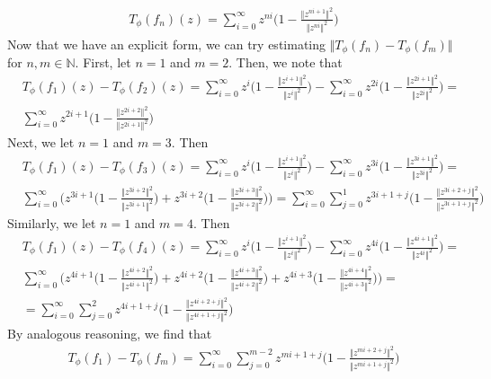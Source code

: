 \documentclass[12pt]{article}
\begin{document}
\begin{align}
T_\phi(f_n)(z) = \sum_{i=0}^\infty z^{ni} \bigg(1 - \frac{\Vert z^{ni+1}\Vert^2}{\Vert z^{ni}\Vert^2}\bigg) 
\end{align} Now that we have an explicit form, we can try estimating $\Vert T_\phi(f_n) - T_\phi(f_m)\Vert $ for $n,m \in \mathbb{N}$. First, let $n = 1$ and $m= 2$. Then, we note that
\begin{align}
&T_\phi(f_1)(z) - T_\phi(f_2)(z) = \sum_{i=0}^\infty z^i\bigg(1- \frac{\Vert z^{i+1}\Vert^2}{\Vert z^i\Vert^2}\bigg) - \sum_{i=0}^\infty z^{2i} \bigg(1 - \frac{\Vert z^{2i+1}\Vert^2}{\Vert z^{2i}\Vert^2}\bigg)=\\
& \sum_{i=0}^\infty z^{2i+1}\bigg(1-\frac{\Vert z^{2i+2}\Vert^2}{\Vert z^{2i+1}\Vert^2}\bigg)
\end{align} 
Next, we let $n = 1$ and $m=3$. Then 
\begin{align}
&T_\phi(f_1)(z) - T_\phi(f_3)(z) = \sum_{i=0}^\infty z^i \bigg(1 - \frac{\Vert z^{i+1}\Vert^2}{\Vert z^i \Vert^2} \bigg) - \sum_{i=0}^\infty z^{3i} \bigg(1 - \frac{\Vert z^{3i+1}\Vert^2}{\Vert z^{3i}\Vert^2}\bigg) =\\
& \sum_{i=0}^\infty \Bigg(z^{3i+1}\bigg(1- \frac{\Vert z^{3i+2}\Vert^2}{\Vert z^{3i+1}\Vert^2}\bigg) + z^{3i+2}\bigg(1 - \frac{\Vert z^{3i+3}\Vert^2}{\Vert z^{3i+2}\Vert^2}\bigg)\Bigg) = \sum_{i=0}^\infty \sum_{j=0}^1 z^{3i+1+j}\bigg(1 - \frac{\Vert z^{3i+2+j}\Vert^2}{{\Vert z^{3i+1+j}\Vert^2}}\bigg)
\end{align} Similarly, we let $n = 1$ and $m = 4$. Then
\begin{align}
&T_\phi(f_1)(z) - T_\phi(f_4)(z) = \sum_{i=0}^\infty z^i \bigg(1 - \frac{\Vert z^{i+1}\Vert^2}{\Vert z^i \Vert^2} \bigg) - \sum_{i=0}^\infty z^{4i} \bigg(1 - \frac{\Vert z^{4i+1}\Vert^2}{\Vert z^{4i}\Vert^2}\bigg) =\\
&\sum_{i=0}^\infty \Bigg( z^{4i+1} \bigg(1 - \frac{\Vert z^{4i+2}\Vert^2}{\Vert z^{4i+1}\Vert^2}\bigg) + z^{4i+2}\bigg(1 - \frac{\Vert z^{4i+3}\Vert^2}{\Vert z^{4i+2}\Vert^2}\bigg) + z^{4i+3}\bigg(1 - \frac{\Vert z^{4i+4}\Vert^2}{\Vert z^{4i+3}\Vert^2}\bigg) \Bigg) = \\
& = \sum_{i=0}^\infty \sum_{j=0}^2 z^{4i+1+j}\bigg(1 - \frac{\Vert z^{4i+2+j}\Vert^2}{\Vert z^{4i+1+j}\Vert^2}\bigg)
\end{align} By analogous reasoning, we find that
\begin{align}
T_\phi(f_1) - T_\phi(f_m) = \sum_{i=0}^\infty \sum_{j=0}^{m-2} z^{mi + 1+ j}\bigg(1 - \frac{\Vert z^{mi+2+j}\Vert^2}{\Vert z^{mi+1+j}\Vert^2}\bigg)
\end{align}
\end{document}
